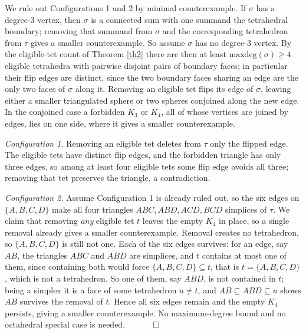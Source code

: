 \documentclass[12pt]{article}
\newcommand{\proofend}{$\quad \qed$}
\newcommand{\kw}{\mathrm}
\newcommand{\maxdeg}{\kw{maxdeg}}
\begin{document}
We rule out Configurations 1 and 2 by minimal counterexample.
If $\sigma$ has a degree-$3$ vertex, then $\sigma$ is a connected sum with
one summand the tetrahedral boundary; removing that summand from $\sigma$ and
the corresponding tetrahedron from $\tau$ gives a smaller counterexample.
So assume $\sigma$ has no degree-$3$ vertex.
By the eligible-tet count of Theorem \ref{th2} there are then at least
$\maxdeg(\sigma)\geq 4$ eligible tetrahedra with pairwise disjoint pairs of
boundary faces; in particular their flip edges are distinct, since the two
boundary faces sharing an edge are the only two faces of $\sigma$ along it.
Removing an eligible tet flips its edge of $\sigma$, leaving either a smaller
triangulated sphere or two spheres conjoined along the new edge.  In the
conjoined case a forbidden $K_3$ or $K_4$, all of whose vertices are joined
by edges, lies on one side, where it gives a smaller counterexample.

\emph{Configuration 1.}  Removing an eligible tet deletes from $\tau$ only
the flipped edge.  The eligible tets have distinct flip edges, and the
forbidden triangle has only three edges, so among at least four eligible
tets some flip edge avoids all three; removing that tet preserves the
triangle, a contradiction.

\emph{Configuration 2.}  Assume Configuration 1 is already ruled out, so the
six edges on $\{A,B,C,D\}$ make all four triangles $ABC,ABD,ACD,BCD$
simplices of $\tau$.  We claim that removing \emph{any} eligible tet $t$
leaves the empty $K_4$ in place, so a single removal already gives a smaller
counterexample.  Removal creates no tetrahedron, so $\{A,B,C,D\}$ is still
not one.  Each of the six edges survives: for an edge, say $AB$, the
triangles $ABC$ and $ABD$ are simplices, and $t$ contains at most one of
them, since containing both would force $\{A,B,C,D\}\subseteq t$, that is
$t=\{A,B,C,D\}$, which is not a tetrahedron.  So one of them, say $ABD$, is
not contained in $t$; being a simplex it is a face of some tetrahedron
$u\neq t$, and $AB\subseteq ABD\subseteq u$ shows $AB$ survives the removal
of $t$.  Hence all six edges remain and the empty $K_4$ persists, giving a
smaller counterexample.  No maximum-degree bound and no octahedral special
case is needed.
\proofend



\end{document}
